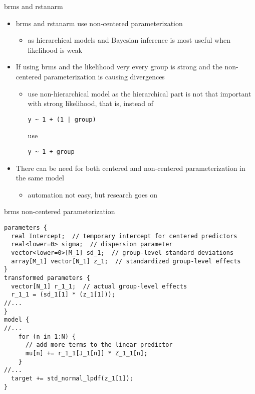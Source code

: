 \documentclass[finnish,english,t]{beamer}
\begin{document}
\begin{frame}[fragile]{brms and rstanarm}

  \begin{itemize}
  \item<+-> brms and rstanarm use non-centered parameterization
    \begin{itemize}
    \item as hierarchical models and Bayesian inference is most useful
      when likelihood is weak
    \end{itemize}
  \item<+-> If using brms and the likelihood very every group is
    strong and the non-centered parameterization is causing
    divergences
    \begin{itemize}
    \item use non-hierarchical model as the hierarchical part is not
      that important with strong likelihood, that is, instead of 
\begin{verbatim}
y ~ 1 + (1 | group)
\end{verbatim}
      use
\begin{verbatim}
y ~ 1 + group
\end{verbatim}
    \end{itemize}
  \item<+-> There can be need for both centered and non-centered
    parameterization in the same model
    \begin{itemize}
    \item automation not easy, but research goes on
    \end{itemize}
  \end{itemize}
\end{frame}

\begin{frame}[fragile]{brms non-centered parameterization}

  \vspace{-\baselineskip}
\begin{verbatim}
parameters {
  real Intercept;  // temporary intercept for centered predictors
  real<lower=0> sigma;  // dispersion parameter
  vector<lower=0>[M_1] sd_1;  // group-level standard deviations
  array[M_1] vector[N_1] z_1;  // standardized group-level effects
}
transformed parameters {
  vector[N_1] r_1_1;  // actual group-level effects
  r_1_1 = (sd_1[1] * (z_1[1]));
//...
}
model {
//...
    for (n in 1:N) {
      // add more terms to the linear predictor
      mu[n] += r_1_1[J_1[n]] * Z_1_1[n];
    }
//...
  target += std_normal_lpdf(z_1[1]);
}
\end{verbatim}

\end{frame}
\end{document}
